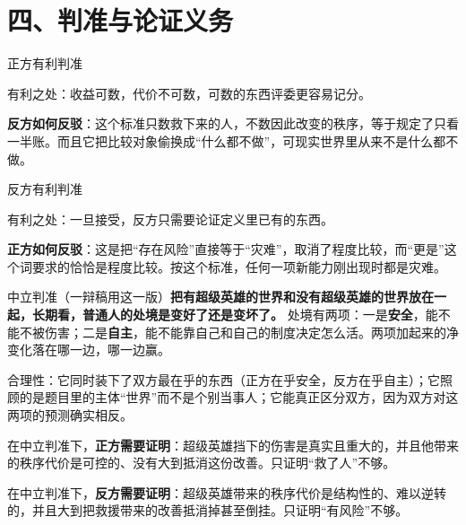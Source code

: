 \documentclass[prep,both]{debate}
\begin{document}
\section{四、判准与论证义务}
\begin{fields}
\begin{procard}{正方有利判准}\end{procard}
\begin{bullets}
\item 有利之处：收益可数，代价不可数，可数的东西评委更容易记分。
\item \textbf{反方如何反驳}：这个标准只数救下来的人，不数因此改变的秩序，等于规定了只看一半账。而且它把比较对象偷换成“什么都不做”，可现实世界里从来不是什么都不做。
\end{bullets}
\begin{concard}{反方有利判准}\end{concard}
\begin{bullets}
\item 有利之处：一旦接受，反方只需要论证定义里已有的东西。
\item \textbf{正方如何反驳}：这是把“存在风险”直接等于“灾难”，取消了程度比较，而“更是”这个词要求的恰恰是程度比较。按这个标准，任何一项新能力刚出现时都是灾难。
\end{bullets}
\begin{neutralcard}{中立判准（一辩稿用这一版）}\textbf{把有超级英雄的世界和没有超级英雄的世界放在一起，长期看，普通人的处境是变好了还是变坏了。} 处境有两项：一是\textbf{安全}，能不能不被伤害；二是\textbf{自主}，能不能靠自己和自己的制度决定怎么活。两项加起来的净变化落在哪一边，哪一边赢。\end{neutralcard}
\begin{bullets}
\item 合理性：它同时装下了双方最在乎的东西（正方在乎安全，反方在乎自主）；它照顾的是题目里的主体“世界”而不是个别当事人；它能真正区分双方，因为双方对这两项的预测确实相反。
\item 在中立判准下，\textbf{正方需要证明}：超级英雄挡下的伤害是真实且重大的，并且他带来的秩序代价是可控的、没有大到抵消这份改善。只证明“救了人”不够。
\item 在中立判准下，\textbf{反方需要证明}：超级英雄带来的秩序代价是结构性的、难以逆转的，并且大到把救援带来的改善抵消掉甚至倒挂。只证明“有风险”不够。
\end{bullets}
\end{fields}
\end{document}
